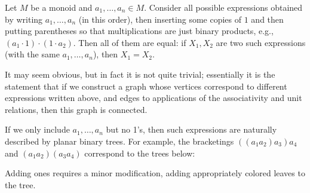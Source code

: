 \begin{theorem}\label{t:coherence-monoids}
  Let $M$ be a monoid and $a_1, \dots, a_n\in M$. Consider all possible
  expressions obtained by writing $a_1, \dots, a_n$ \textup{(}in this
  order\textup{)}, then inserting some copies of $1$ and then putting
  parentheses so that multiplications are just binary products, e.g.,
  $(a_1 \cdot 1) \cdot (1 \cdot a_2) $. Then all of them are equal: if
  $X_1, X_2$ are two such expressions \textup{(}with the same
  $a_1, \dots, a_n$\textup{)}, then $X_1=X_2$.
\end{theorem}
It may seem obvious, but in fact it is not quite trivial; essentially it is the
statement that if we construct a graph whose vertices correspond to different
expressions written above, and edges to applications of the associativity and
unit relations, then this graph is connected.

If we only include $a_1, \dots, a_n$ but no 1's, then such expressions are
naturally described by planar binary trees. For example, the bracketings $((a_1
a_2)a_3) a_4$ and $(a_1 a_2)(a_3 a_4)$ correspond to the trees below:

\begin{center}
  \qquad
\end{center}
Adding ones requires a minor modification, adding appropriately
colored leaves to the tree.

